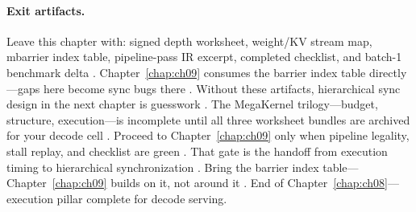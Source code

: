 \paragraph{Exit artifacts.}
Leave this chapter with: signed depth worksheet, weight/KV stream map, mbarrier index table, pipeline-pass IR excerpt, completed checklist, and batch-1 benchmark delta \citep{yirage2026,chen2020compilerbasedhardw,shah2024flashattention3,patel2025llminference,taxbreak2026,semianalysis2024tma,mpk2025,wu2024mirage}.
Chapter~\ref{chap:ch09} consumes the barrier index table directly---gaps here become sync bugs there \citep{taxbreak2026,dao2022flashattention,nvidia2022hopper}.
Without these artifacts, hierarchical sync design in the next chapter is guesswork \citep{yirage2026,shah2024flashattention3,patel2025llminference,chen2020compilerbasedhardw}.
The MegaKernel trilogy---budget, structure, execution---is incomplete until all three worksheet bundles are archived for your decode cell \citep{dao2022flashattention,memoryfloor2026,taxbreak2026,mpk2025,wu2024mirage}.
Proceed to Chapter~\ref{chap:ch09} only when pipeline legality, stall replay, and checklist are green \citep{semianalysis2024tma,shah2024flashattention3,yirage2026,chen2020compilerbasedhardw,patel2025llminference}.
That gate is the handoff from execution timing to hierarchical synchronization \citep{taxbreak2026,dao2022flashattention,mpk2025,memoryfloor2026}.
Bring the barrier index table---Chapter~\ref{chap:ch09} builds on it, not around it \citep{semianalysis2024tma,yirage2026,shah2024flashattention3,nvidia2022hopper}.
End of Chapter~\ref{chap:ch08}---execution pillar complete for decode serving.

